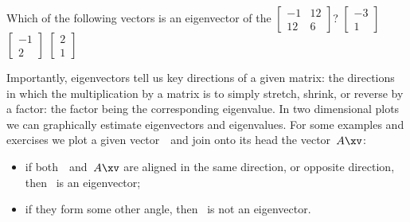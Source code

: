 \begin{activity}
Which of the following vectors is an eigenvector of the  \(\begin{bmatrix} -1&12\\12&6 \end{bmatrix}\)?
{\(\begin{bmatrix} -3\\1 \end{bmatrix}\)}
{\(\begin{bmatrix} -1\\2 \end{bmatrix}\)}
{\(\begin{bmatrix} 2\\1 \end{bmatrix}\)}
\end{activity}



Importantly, eigenvectors tell us key directions of a given matrix: the directions in which the multiplication by a matrix is to simply stretch, shrink, or reverse by a factor: the factor being the corresponding eigenvalue.
In two dimensional plots we can graphically estimate eigenvectors and eigenvalues.
For some examples and exercises we plot a given vector~\xv\ and join onto its head the vector~\(A\xv\): \begin{itemize}
\item if both~\xv\ and~\(A\xv\) are aligned in the same direction, or opposite direction, then \xv~is an eigenvector; 
\item if they form some other angle, then \xv~is not an eigenvector.
\end{itemize}
  

